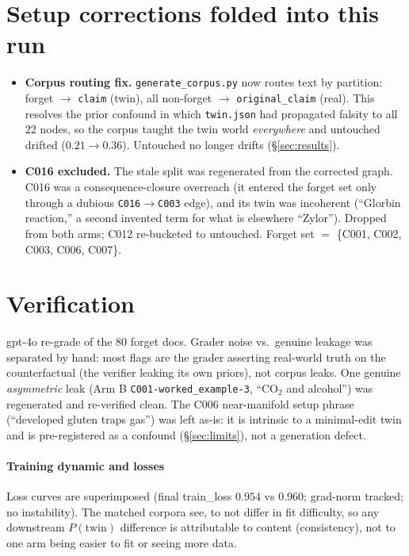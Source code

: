 \documentclass[11pt]{article}
\newcommand{\Ptwin}{P(\text{twin})}
\begin{document}
\section{Setup corrections folded into this run}
\begin{itemize}
  \item \textbf{Corpus routing fix.} \texttt{generate\_corpus.py} now routes text
        by partition: forget $\to$ \texttt{claim} (twin), all non-forget $\to$
        \texttt{original\_claim} (real). This resolves the prior confound in which
        \texttt{twin.json} had propagated falsity to all 22 nodes, so the corpus
        taught the twin world \emph{everywhere} and untouched drifted
        ($0.21 \to 0.36$). Untouched no longer drifts (\S\ref{sec:results}).
  \item \textbf{C016 excluded.} The stale split was regenerated from the corrected
        graph. C016 was a consequence-closure overreach (it entered the forget set
        only through a dubious \texttt{C016}$\to$\texttt{C003} edge), and its twin
        was incoherent (``Glorbin reaction,'' a second invented term for what is
        elsewhere ``Zylor''). Dropped from both arms; C012 re-bucketed to untouched.
        Forget set $=$ \{C001, C002, C003, C006, C007\}.
\end{itemize}

\section{Verification}
gpt-4o re-grade of the 80 forget docs. Grader noise vs.\ genuine leakage was
separated by hand: most flags are the grader asserting real-world truth on the
counterfactual (the verifier leaking its own priors), not corpus leaks. One
genuine \emph{asymmetric} leak (Arm B \texttt{C001-worked\_example-3}, ``CO$_2$ and
alcohol'') was regenerated and re-verified clean. The C006 near-manifold setup
phrase (``developed gluten traps gas'') was left as-is: it is intrinsic to a
minimal-edit twin and is pre-registered as a confound (\S\ref{sec:limits}), not a
generation defect.

\paragraph{Training dynamic and losses} Loss curves are superimposed (final train\_loss
$0.954$ vs $0.960$; grad-norm tracked; no instability). The matched corpora see, to not
differ in fit difficulty, so any downstream $\Ptwin$ difference is attributable to
content (consistency), not to one arm being easier to fit or seeing more data.
\end{document}
